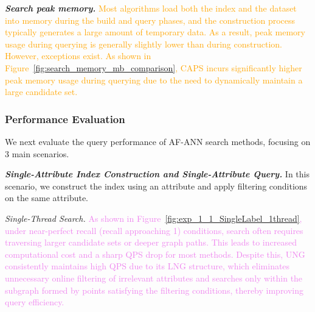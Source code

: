 \documentclass[sigconf, nonacm]{acmart}
\begin{document}
{\textit{\textbf{Search peak memory.}}
\textcolor{orange}{
Most algorithms load both the index and the dataset into memory during the build and query phases, and the construction process typically generates a large amount of temporary data. As a result, peak memory usage during querying is generally slightly lower than during construction. However, exceptions exist. As shown in Figure~\ref{fig:search_memory_mb_comparison}, CAPS incurs significantly higher peak memory usage during querying due to the need to dynamically maintain a large candidate set.}
	
	\subsubsection{Performance Evaluation}
	
	
	
	
	We next evaluate the query performance of AF-ANN search methods, focusing on 3 main scenarios.
	
	\textit{\textbf{Single-Attribute Index Construction and Single-Attribute Query.}}
	In this scenario, we construct the index using an attribute and apply filtering conditions on the same attribute.
	
	
	\textit{Single-Thread Search.}  
	\textcolor{violet}{As shown in Figure~\ref{fig:exp_1_1_SingleLabel_1thread}, under near-perfect recall (recall approaching 1) conditions, search often requires traversing larger candidate sets or deeper graph paths. This leads to increased computational cost and a sharp QPS drop for most methods. Despite this, UNG consistently maintains high QPS due to its LNG structure, which eliminates unnecessary online filtering of irrelevant attributes and searches only within the subgraph formed by points satisfying the filtering conditions, thereby improving query efficiency.}
	
}
\end{document}
